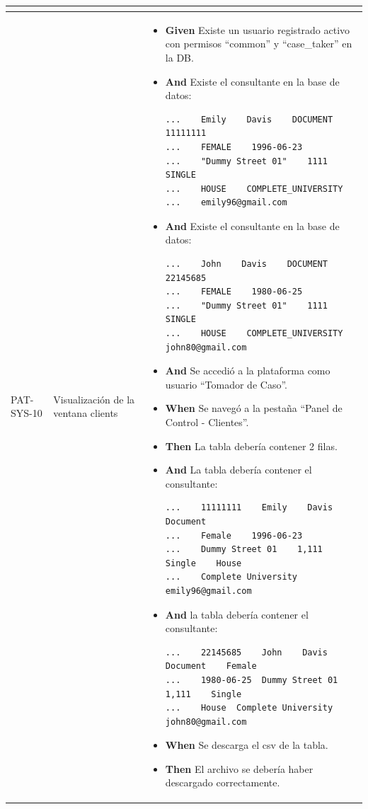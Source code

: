 \begin{longtable}{|p{1cm}|p{2.5cm}|p{12cm}|}
\begin{itemize}
    \end{itemize}
    \\
    \hline
    PAT-SYS-10 & Visualización de la ventana clients &
    \begin{itemize}
        \item \textbf{Given} Existe un usuario registrado activo con permisos ``common'' y ``case\_taker'' en la DB.
        \item \textbf{And} Existe el consultante en la base de datos:
        \begin{verbatim}
...    Emily    Davis    DOCUMENT    11111111
...    FEMALE    1996-06-23
...    "Dummy Street 01"    1111    SINGLE
...    HOUSE    COMPLETE_UNIVERSITY
...    emily96@gmail.com
        \end{verbatim}
        \item \textbf{And} Existe el consultante en la base de datos:
        \begin{verbatim}
...    John    Davis    DOCUMENT    22145685
...    FEMALE    1980-06-25
...    "Dummy Street 01"    1111    SINGLE
...    HOUSE    COMPLETE_UNIVERSITY   john80@gmail.com
        \end{verbatim}
        \item \textbf{And} Se accedió a la plataforma como usuario ``Tomador de Caso''.
        \item \textbf{When} Se navegó a la pestaña ``Panel de Control - Clientes''.
        \item \textbf{Then} La tabla debería contener 2 filas.
        \item \textbf{And} La tabla debería contener el consultante:
        \begin{verbatim}
...    11111111    Emily    Davis    Document
...    Female    1996-06-23
...    Dummy Street 01    1,111    Single    House
...    Complete University   emily96@gmail.com
        \end{verbatim}
        \item \textbf{And} la tabla debería contener el consultante:
           \begin{verbatim}
...    22145685    John    Davis    Document    Female
...    1980-06-25  Dummy Street 01    1,111    Single
...    House  Complete University   john80@gmail.com
       \end{verbatim}
        \item \textbf{When} Se descarga el csv de la tabla.
        \item \textbf{Then} El archivo se debería haber descargado correctamente.

\end{itemize}
\end{longtable}
